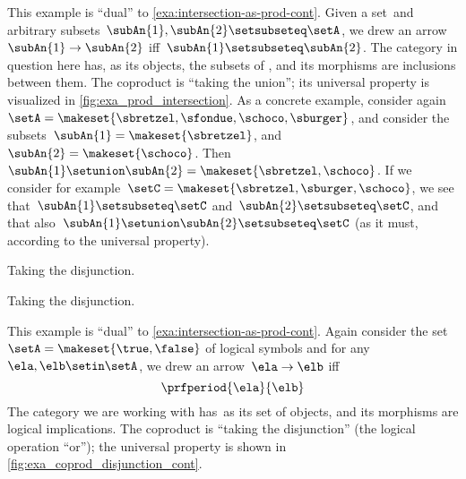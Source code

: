 \begin{example}
    \label{exa:union-as-coprod-cont}
    This example is ``dual'' to \cref{exa:intersection-as-prod-cont}.
    Given a set~\setA and arbitrary subsets~$\subAn{1}, \subAn{2} \setsubseteq \setA$, we drew an arrow~$\subAn{1} \to \subAn{2}$ iff~$\subAn{1} \setsubseteq \subAn{2}$.
    The category in question here has, as its objects, the subsets of \setA, and its morphisms are inclusions between them.
    The coproduct is ``taking the union''; its universal property is visualized in \cref{fig:exa_prod_intersection}.
    As a concrete example, consider again~$\setA = \makeset{ \sbretzel, \sfondue, \schoco, \sburger }$, and consider the subsets~$\subAn{1} = \makeset{ \sbretzel }$, and~$\subAn{2} = \makeset{\schoco}$.
    Then~$\subAn{1} \setunion \subAn{2} = \makeset{ \sbretzel, \schoco }$.
    If we consider for example~$\setC = \makeset{ \sbretzel, \sburger, \schoco }$, we see that~$\subAn{1}  \setsubseteq \setC$ and~$\subAn{2} \setsubseteq \setC$, and that also~$\subAn{1} \setunion \subAn{2} \setsubseteq \setC$ (as it must, according to the universal property).
\end{example}


\begin{marginfigure}
    \centering
    \caption{Taking the disjunction.}
    \label{fig:exa_coprod_disjunction_cont}
\end{marginfigure}

\begin{marginfigure}
    \centering
    \caption{Taking the disjunction.}
    \label{fig:exa_coprod_disjunction_bool_cont}
\end{marginfigure}


\begin{example}
    \label{exa:disjunction-as-coprod-cont}
    This example is ``dual'' to \cref{exa:intersection-as-prod-cont}.
    Again consider the set~$\setA = \makeset{ \true, \false }$ of logical symbols and for any~$\ela, \elb  \setin \setA$, we drew an arrow~$\ela \to \elb$ iff
    \begin{equation}
        \prfperiod{\ela}{\elb}
    \end{equation}
    The category we are working with has~\setA as its set of objects, and its morphisms are logical implications.
    The coproduct is ``taking the disjunction'' (the logical operation ``or''); the universal property is shown in \cref{fig:exa_coprod_disjunction_cont}.
\end{example}

